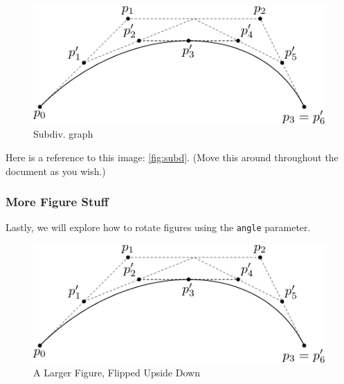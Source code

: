 \documentclass[12pt,twoside]{reedthesis}
\begin{document}
  \begin{figure}[h!tbp]
  \centering
  \includegraphics[angle = 0,scale = 0.75]{figure/subdivision.pdf}
  \caption[Subdiv. graph]{\normalsize{Subdiv. graph}}
  \label{fig:subd}
  \end{figure}
  
  Here is a reference to this image: \autoref{fig:subd}. (Move this around
  throughout the document as you wish.)
  
  \subsubsection{More Figure Stuff}\label{more-figure-stuff-2}
  
  Lastly, we will explore how to rotate figures using the \texttt{angle}
  parameter.
  
  \begin{Shaded}
  \begin{Highlighting}[]
  \NormalTok{(}\NormalTok{, }
        \NormalTok{, }
         \NormalTok{,}
         \NormalTok{,}
         \NormalTok{)}
  \end{Highlighting}
  \end{Shaded}
  
  \begin{figure}[h!tbp]
  \centering
  \includegraphics[angle = 180,scale = 1.5]{figure/subdivision.pdf}
  \caption[A Larger Figure, Flipped Upside Down]{\normalsize{A Larger Figure, Flipped Upside Down}}
  \label{fig:subd2}
  \end{figure}
  
\end{document}
